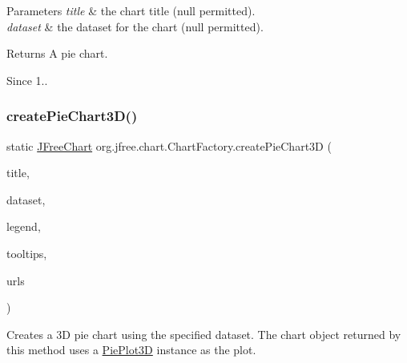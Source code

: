 \begin{DoxyParams}{Parameters}
{\em title} & the chart title ({\ttfamily null} permitted). \\
\hline
{\em dataset} & the dataset for the chart ({\ttfamily null} permitted).\\
\hline
\end{DoxyParams}
\begin{DoxyReturn}{Returns}
A pie chart.
\end{DoxyReturn}
\begin{DoxySince}{Since}
1.. 
\end{DoxySince}
\mbox{\label{classorg_1_1jfree_1_1chart_1_1_chart_factory_ab1426d49e5dea47c4761f6d897fecf03}} 
\subsubsection{\texorpdfstring{create\+Pie\+Chart3\+D()}{createPieChart3D()}\hspace{0.1cm}{\footnotesize\ttfamily [3/3]}}
{\footnotesize\ttfamily static \mbox{\hyperlink{classorg_1_1jfree_1_1chart_1_1_j_free_chart}{J\+Free\+Chart}} org.\+jfree.\+chart.\+Chart\+Factory.\+create\+Pie\+Chart3D (\begin{DoxyParamCaption}\item[{String}]{title,  }\item[{\mbox{\hyperlink{interfaceorg_1_1jfree_1_1data_1_1general_1_1_pie_dataset}{Pie\+Dataset}}}]{dataset,  }\item[{boolean}]{legend,  }\item[{boolean}]{tooltips,  }\item[{boolean}]{urls }\end{DoxyParamCaption})\hspace{0.3cm}{\ttfamily [static]}}

Creates a 3D pie chart using the specified dataset. The chart object returned by this method uses a \mbox{\hyperlink{}{Pie\+Plot3D}} instance as the plot.


